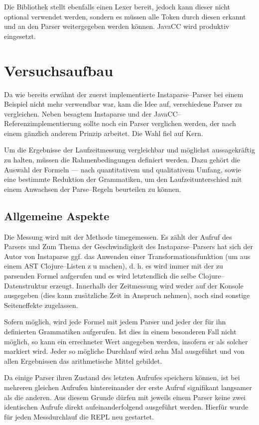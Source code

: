 \documentclass[ngerman,a4paper,abstracton,open=right,twoside=false,toc=listofnumbered,bibtotocnumbered]{scrreprt}
\begin{document}
Die Bibliothek stellt ebenfalls einen Lexer bereit, jedoch kann dieser nicht optional verwendet werden, sondern es müssen alle Token durch diesen erkannt und an den Parser weitergegeben werden können. JavaCC wird produktiv eingesetzt.

\chapter{Versuchsaufbau}

Da wie bereits erwähnt der zuerst implementierte Instaparse--Parser bei einem Beispiel nicht mehr verwendbar war, kam die Idee auf, verschiedene Parser zu vergleichen. Neben besagtem Instaparse und der JavaCC--Referenzimplementierung sollte noch ein Parser verglichen werden, der nach einem gänzlich anderem Prinzip arbeitet. Die Wahl fiel auf Kern.

Um die Ergebnisse der Laufzeitmessung vergleichbar und möglichst aussagekräftig zu halten, müssen die Rahmenbedingungen definiert werden. Dazu gehört die Auswahl der Formeln --- nach quantitativem und qualitativem Umfang, sowie eine bestimmte Reduktion der Grammatiken, um den Laufzeitunterschied mit einem Anwachsen der Parse--Regeln beurteilen zu können.

\section{Allgemeine Aspekte}

Die Messung wird mit der Methode \glqq time\grqq gemessen. Es zählt der Aufruf des Parsers und Zum Thema der Geschwindigkeit des Instaparse--Parsers hat sich der Autor von Instaparse ggf. das Anwenden einer Transformationsfunktion (um aus einem AST Clojure--Listen z
u machen), d. h. es wird immer mit der zu parsenden Formel aufgerufen und es wird letztendlich die selbe Clojure--Datenstruktur erzeugt. Innerhalb der Zeitmessung wird weder auf der Konsole ausgegeben (dies kann zusätzliche Zeit in Anspruch nehmen), noch sind sonstige Seiteneffekte zugelassen.

Sofern möglich, wird jede Formel mit jedem Parser und jeder der für ihn definierten Grammatiken aufgerufen. Ist dies in einem besonderen Fall nicht möglich, so kann ein errechneter Wert angegeben werden, insofern er als solcher markiert wird. Jeder so mögliche Durchlauf wird zehn Mal ausgeführt und von allen Ergebnissen das arithmetische Mittel gebildet.

Da einige Parser ihren Zustand des letzten Aufrufes speichern können, ist bei mehreren gleichen Aufrufen hintereinander der erste Aufruf signifikant langsamer als die anderen. Aus diesem Grunde dürfen mit jeweils einem Parser keine zwei identischen Aufrufe direkt aufeinanderfolgend ausgeführt werden. Hierfür wurde für jeden Messdurchlauf die REPL neu gestartet.
\end{document}

